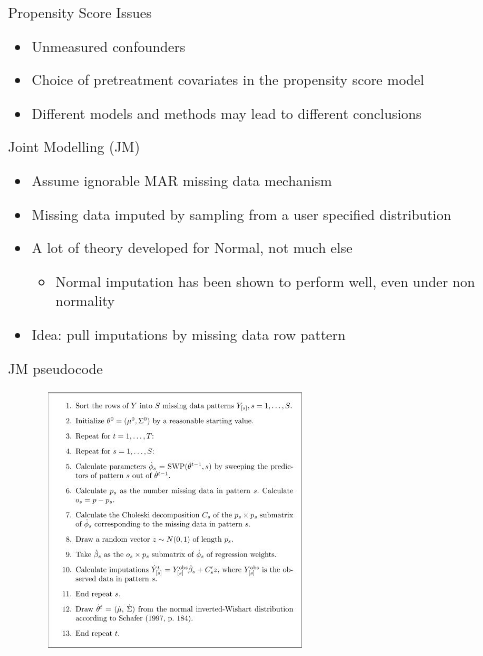 \begin{frame}{Propensity Score Issues}
 \begin{itemize}
  \item Unmeasured confounders
  \item Choice of pretreatment covariates in the propensity score model
  \item Different models and methods may lead to different conclusions
 \end{itemize}

\end{frame}

\begin{frame}{Joint Modelling (JM)}
 \begin{itemize}
  \item Assume ignorable MAR  missing data mechanism
  \item Missing data imputed by sampling from a user specified distribution
  \item A lot of theory developed for Normal, not much else
  \begin{itemize}
   \item Normal imputation has been shown to perform well, even under non normality \cite{Demirtas2008}
  \end{itemize}
\item Idea: pull imputations by missing data row pattern
 \end{itemize}

\end{frame}

\begin{frame}{JM pseudocode}
 \begin{figure}[h!]
  \centering
    \includegraphics[width=0.6\textwidth]{jm_algo}
\label{fig:jmexample}
\end{figure}
\end{frame}

